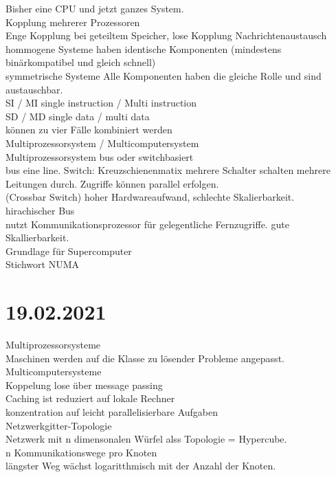 \documentclass{article}
\begin{document}
	Bisher eine CPU und jetzt ganzes System. \\
	Kopplung mehrerer Prozessoren \\
	Enge Kopplung bei geteiltem Speicher, lose Kopplung Nachrichtenaustausch \\
	hommogene Systeme haben identische Komponenten (mindestens binärkompatibel und gleich schnell) \\
	symmetrische Systeme Alle Komponenten haben die gleiche Rolle und sind austauschbar. \\
	SI / MI single instruction / Multi instruction\\
	SD / MD single data / multi data \\
	können zu vier Fälle kombiniert werden \\
	Multiprozessorsystem / Multicomputersystem \\
	Multiprozessorsystem bus oder switchbasiert \\
	bus eine line. Switch: Kreuzschienenmatix  mehrere Schalter schalten mehrere Leitungen durch. Zugriffe können parallel erfolgen. \\
	(Crossbar Switch) hoher Hardwareaufwand, schlechte Skalierbarkeit. \\
	hirachischer Bus \\
	nutzt Kommunikationsprozessor für gelegentliche Fernzugriffe. gute Skallierbarkeit. \\
	Grundlage für Supercomputer \\
	Stichwort NUMA \\
	\section*{19.02.2021}
	Multiprozessorsysteme \\
	Maschinen werden auf die Klasse zu lösender Probleme angepasst. \\
	Multicomputersysteme \\
	Koppelung lose über message passing \\
	Caching ist reduziert auf lokale Rechner \\
	konzentration auf leicht parallelisierbare Aufgaben  \\
	Netzwerkgitter-Topologie \\
	Netzwerk mit n dimensonalen Würfel alss Topologie = Hypercube. \\
	n Kommunikationswege pro Knoten \\
	längster Weg wächst logaritthmisch mit der Anzahl der Knoten. \\
	
\end{document}
